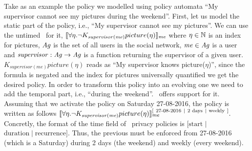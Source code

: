   \begin{example}
  Take as an example the policy we modelled using policy automata ``My supervisor cannot see my pictures during the weekend''. First, let us model the static part of the policy, i.e., ``My supervisor cannot see my pictures''. We can use the untimed \ppl~for it,
  $ \llbracket \forall \eta. \neg K_{\mathit{supervisor(me)}} picture(\eta) \rrbracket_{\mathit{me}}$
  where $\eta \in \mathbb{N}$ is an index for pictures, $\mathit{Ag}$ is the set of all users in the social network, $\mathit{me} \in \mathit{Ag}$ is a user and $\mathit{supervisor} : \mathit{Ag} \rightarrow \mathit{Ag}$ is a function returning the supervisor of a given user. $K_{\mathit{supervisor(me)}} picture(\eta)$ reads as ``My supervisor knows picture($\eta$)'', since the formula is negated and the index for pictures universally quantified we get the desired policy. In order to transform this policy into an evolving one we need to add the temporal part, i.e., ``during the weekend''. \tppl~offers support for it. Assuming that we activate the policy on Saturday 27-08-2016, the policy is written as follows
  $\llbracket \forall \eta. \neg K_{\mathit{supervisor(me)}} picture(\eta) \rrbracket_{\mathit{me}}^{[ ~ \text{27-08-2016} ~ \mid ~ \text{2 days} ~ \mid ~ \text{weekly} ~ ]}.$
  Concretly, the format of the time field of \tppl~privacy policies is $[\text{start} $ $\mid $ $\text{duration} \mid \text{recurrence} ]$. Thus, the previous must be enforced from 27-08-2016 (which is a Saturday) during 2 days (the weekend) and weekly (every weekend).
    \end{example}
